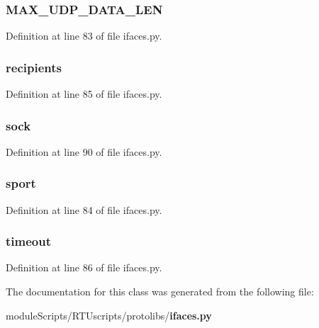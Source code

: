 \subsubsection[{M\+A\+X\+\_\+\+U\+D\+P\+\_\+\+D\+A\+T\+A\+\_\+\+L\+E\+N}]{\setlength{\rightskip}{0pt plus 5cm}M\+A\+X\+\_\+\+U\+D\+P\+\_\+\+D\+A\+T\+A\+\_\+\+L\+E\+N}\label{classprotolibs_1_1ifaces_1_1udp_ade421d473746e44a67e8392d294df0d6}


Definition at line 83 of file ifaces.\+py.

\subsubsection[{recipients}]{\setlength{\rightskip}{0pt plus 5cm}recipients}\label{classprotolibs_1_1ifaces_1_1udp_aafc93a72b0076e97ab7e8384e9cc1472}


Definition at line 85 of file ifaces.\+py.

\subsubsection[{sock}]{\setlength{\rightskip}{0pt plus 5cm}sock}\label{classprotolibs_1_1ifaces_1_1udp_a6f3a42a6e2447bdc41d1dedba98c762c}


Definition at line 90 of file ifaces.\+py.

\subsubsection[{sport}]{\setlength{\rightskip}{0pt plus 5cm}sport}\label{classprotolibs_1_1ifaces_1_1udp_ac345573735b6acde22a423bb2f1dfa76}


Definition at line 84 of file ifaces.\+py.

\subsubsection[{timeout}]{\setlength{\rightskip}{0pt plus 5cm}timeout}\label{classprotolibs_1_1ifaces_1_1udp_aee145bfca8e9b2eaf3cd3c47157be9a3}


Definition at line 86 of file ifaces.\+py.



The documentation for this class was generated from the following file\+:\begin{DoxyCompactItemize}
\item 
module\+Scripts/\+R\+T\+Uscripts/protolibs/{\bf ifaces.\+py}\end{DoxyCompactItemize}
